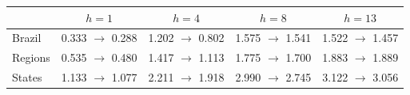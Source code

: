 \begin{tabular}{lcccc}
\toprule
 & $h=1$ & $h=4$ & $h=8$ & $h=13$ \\
\midrule
Brazil & 0.333 $\to$ 0.288 & 1.202 $\to$ 0.802 & 1.575 $\to$ 1.541 & 1.522 $\to$ 1.457 \\
Regions & 0.535 $\to$ 0.480 & 1.417 $\to$ 1.113 & 1.775 $\to$ 1.700 & 1.883 $\to$ 1.889 \\
States & 1.133 $\to$ 1.077 & 2.211 $\to$ 1.918 & 2.990 $\to$ 2.745 & 3.122 $\to$ 3.056 \\
\bottomrule
\end{tabular}
